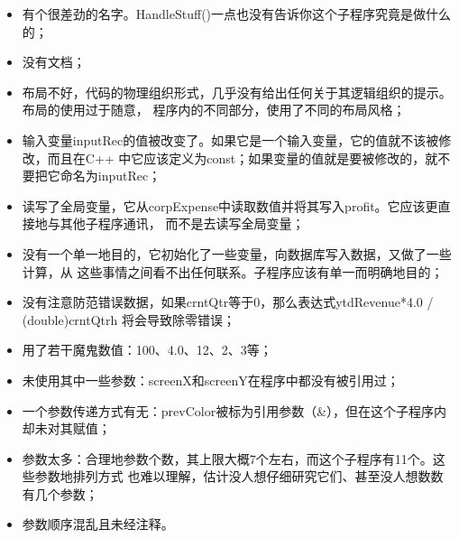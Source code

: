 \documentclass{article}
\begin{document}
\begin{itemize}
    \item 有个很差劲的名字。HandleStuff()一点也没有告诉你这个子程序究竟是做什么的；
    \item 没有文档；
    \item 布局不好，代码的物理组织形式，几乎没有给出任何关于其逻辑组织的提示。布局的使用过于随意，
    程序内的不同部分，使用了不同的布局风格；
    \item 输入变量inputRec的值被改变了。如果它是一个输入变量，它的值就不该被修改，而且在C++
    中它应该定义为const；如果变量的值就是要被修改的，就不要把它命名为inputRec；
    \item 读写了全局变量，它从corpExpense中读取数值并将其写入profit。它应该更直接地与其他子程序通讯，
    而不是去读写全局变量；
    \item 没有一个单一地目的，它初始化了一些变量，向数据库写入数据，又做了一些计算，从
    这些事情之间看不出任何联系。子程序应该有单一而明确地目的；
    \item 没有注意防范错误数据，如果crntQtr等于0，那么表达式ytdRevenue*4.0 / (double)crntQtrh
    将会导致除零错误；
    \item 用了若干魔鬼数值：100、4.0、12、2、3等；
    \item 未使用其中一些参数：screenX和screenY在程序中都没有被引用过；
    \item 一个参数传递方式有无：prevColor被标为引用参数（\&），但在这个子程序内却未对其赋值；
    \item 参数太多：合理地参数个数，其上限大概7个左右，而这个子程序有11个。这些参数地排列方式
    也难以理解，估计没人想仔细研究它们、甚至没人想数数有几个参数；
    \item 参数顺序混乱且未经注释。
\end{itemize}
\end{document}

